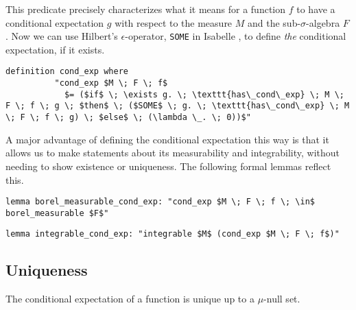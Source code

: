 This predicate precisely characterizes what it means for a function $f$ to have a conditional expectation $g$ with respect to the measure $M$ and the sub-$\sigma$-algebra $F$. Now we can use Hilbert's $\epsilon$-operator, \lstinline[language=isabelle]{SOME} in Isabelle \cite{Nipkow-Paulson-Wenzel:2002}, to define \textit{the} conditional expectation, if it exists.

\begin{isadefinition}
{\small
	\begin{lstlisting}[style=isabelle]
		definition cond_exp where 
		  "cond_exp $M \; F \; f$ 
			$= ($if$ \; \exists g. \; \texttt{has\_cond\_exp} \; M \; F \; f \; g \; $then$ \; ($SOME$ \; g. \; \texttt{has\_cond\_exp} \; M \; F \; f \; g) \; $else$ \; (\lambda \_. \; 0))$"
	\end{lstlisting}
}
\end{isadefinition}

A major advantage of defining the conditional expectation this way is that it allows us to make statements about its measurability and integrability, without needing to show existence or uniqueness. The following formal lemmas reflect this.

\begin{isalemma}
{\small
	\begin{lstlisting}[style=isabelle]
	lemma borel_measurable_cond_exp: "cond_exp $M \; F \; f \; \in$ borel_measurable $F$"
	\end{lstlisting}
}
\end{isalemma}

\begin{isalemma}
{\small
	\begin{lstlisting}[style=isabelle]
	lemma integrable_cond_exp: "integrable $M$ (cond_exp $M \; F \; f$)"
	\end{lstlisting}
}
\end{isalemma}

\subsection{Uniqueness}

The conditional expectation of a function is unique up to a $\mu$-null set. 

